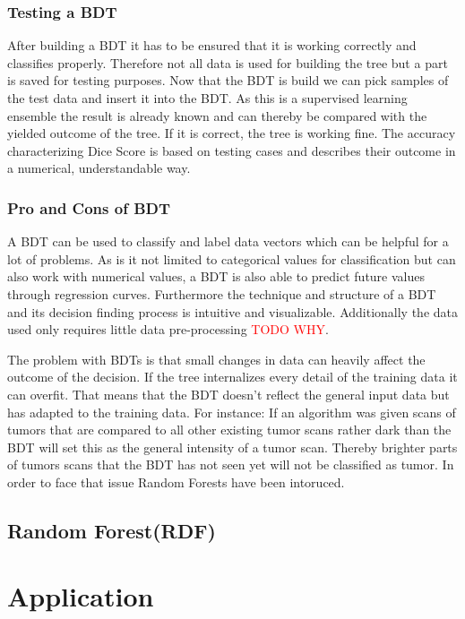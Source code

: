 \documentclass[
12pt,
headsepline,
bibliography=totoc,
twoside=semi,
fleqn
]{scrartcl}
\begin{document}
    \subsubsection{Testing a BDT\label{sec:sec2-1-4}}
      After building a BDT it has to be ensured that it is working correctly and classifies properly. Therefore not all data is used for building the tree but a part is saved for testing purposes. Now that the BDT is build we can pick samples of the test data and insert it into the BDT. As this is a supervised learning ensemble the result is already known and can thereby be compared with the yielded outcome of the tree. If it is correct, the tree is working fine. The accuracy characterizing Dice Score is based on testing cases and describes their outcome in a numerical, understandable way. 

    \subsubsection{Pro and Cons of BDT\label{sec:sec2-1-5}}
      A BDT can be used to classify and label data vectors which can be helpful for a lot of problems. As is it not limited to categorical values for classification but can also work with numerical values, a BDT is also able to predict future values through regression curves. Furthermore the technique and structure of a BDT and its decision finding process is intuitive and visualizable. Additionally the data used only requires little data pre-processing \textcolor{red}{TODO WHY}.

      The problem with BDTs is that small changes in data can heavily affect the outcome of the decision. If the tree internalizes every detail of the training data it can overfit. That means that the BDT doesn't reflect the general input data but has adapted to the training data. For instance: If an algorithm was given scans of tumors that are compared to all other existing tumor scans rather dark than the BDT will set this as the general intensity of a tumor scan. Thereby brighter parts of tumors scans that the BDT has not seen yet will not be classified as tumor. In order to face that issue Random Forests have been intoruced.   



  \subsection{Random Forest(RDF)\label{sec:sec2-2}}

\section{Application\label{sec:sec3}}
\end{document}
